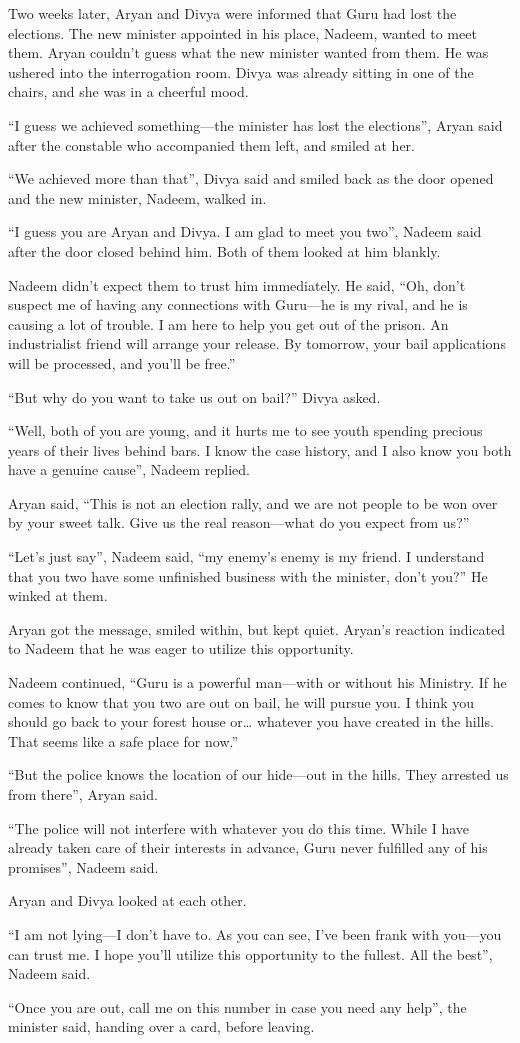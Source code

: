Two weeks later, Aryan and Divya were informed that Guru had lost the elections.
The new minister appointed in his place, Nadeem, wanted to meet them. Aryan
couldn't guess what the new minister wanted from them. He was ushered into
the interrogation room. Divya was already sitting in one of the chairs, and she
was in a cheerful mood.

“I guess we achieved something—the minister has lost the elections”, Aryan
said after the constable who accompanied them left, and smiled at her.

“We achieved more than that”, Divya said and smiled back as the door opened and
the new minister, Nadeem, walked in.

“I guess you are Aryan and Divya. I am glad to meet you two”, Nadeem said after
the door closed behind him. Both of them looked at him blankly.

Nadeem didn't expect them to trust him immediately. He said, “Oh, don't suspect
me of having any connections with Guru—he is my rival, and he is causing a lot of
trouble. I am here to help you get out of the prison. An industrialist friend
will arrange your release. By tomorrow, your bail applications will be processed,
and you'll be free.”

“But why do you want to take us out on bail?” Divya asked.

“Well, both of you are young, and it hurts me to see youth spending precious
years of their lives behind bars. I know the case history, and I also know you
both have a genuine cause”, Nadeem replied.

Aryan said, “This is not an election rally, and we are not people to be won over
by your sweet talk. Give us the real reason—what do you expect from us?”

“Let's just say”, Nadeem said, “my enemy's enemy is my friend. I understand that
you two have some unfinished business with the minister, don't you?” He winked
at them.

Aryan got the message, smiled within, but kept quiet. Aryan's reaction
indicated to Nadeem that he was eager to utilize this opportunity.

Nadeem continued, “Guru is a powerful man—with or without his Ministry. If he
comes to know that you two are out on bail, he will pursue you. I think you
should go back to your forest house or… whatever you have created in the
hills. That seems like a safe place for now.”

“But the police knows the location of our hide—out in the hills. They arrested
us from there”, Aryan said.

“The police will not interfere with whatever you do this time. While I have
already taken care of their interests in advance, Guru never fulfilled any of
his promises”, Nadeem said.

Aryan and Divya looked at each other.

“I am not lying—I don't have to. As you can see, I've been frank with you—you
can trust me. I hope you'll utilize this opportunity to the fullest. All the
best”, Nadeem said.

“Once you are out, call me on this number in case you need any help”, the
minister said, handing over a card, before leaving.